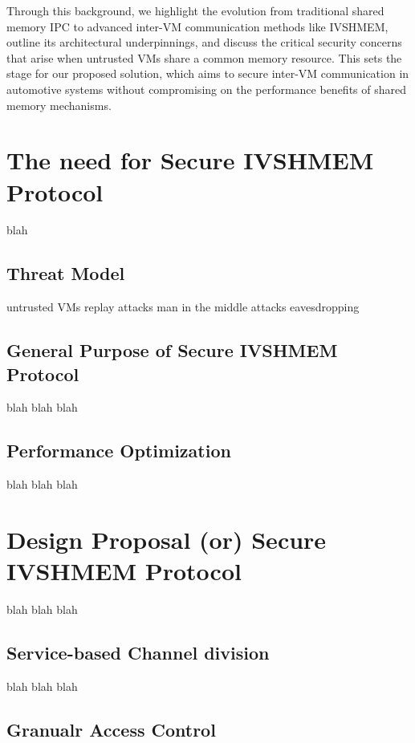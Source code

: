 \documentclass[letterpaper,twocolumn,10pt]{article}
\begin{document}
Through this background, we highlight the evolution from traditional shared memory IPC to advanced inter-VM communication methods like IVSHMEM, outline its architectural underpinnings, and discuss the critical security concerns that arise when untrusted VMs share a common memory resource. This sets the stage for our proposed solution, which aims to secure inter-VM communication in automotive systems without compromising on the performance benefits of shared memory mechanisms.




\section{The need for Secure IVSHMEM Protocol}

blah

\subsection{Threat Model}


untrusted VMs
replay attacks
man in the middle attacks
eavesdropping



\subsection{General Purpose of Secure IVSHMEM Protocol}

blah blah blah

\subsection{Performance Optimization}

blah blah blah



\section{Design Proposal (or) Secure IVSHMEM Protocol}

blah blah blah




\subsection{Service-based Channel division}
blah blah blah

\subsection{Granualr Access Control}
\end{document}
